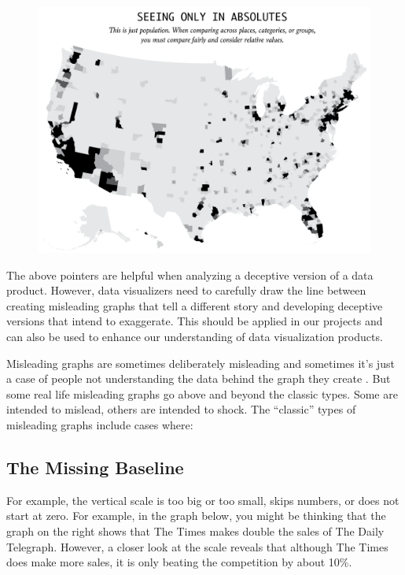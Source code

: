 \documentclass[]{book}
\theoremstyle{definition}
\theoremstyle{definition}
\theoremstyle{definition}
\theoremstyle{remark}
\begin{document}
\begin{figure}
\centering
\includegraphics{images/Maps1.png}
\caption{}
\end{figure}

The above pointers are helpful when analyzing a deceptive version of a
data product. However, data visualizers need to carefully draw the line
between creating misleading graphs that tell a different story and
developing deceptive versions that intend to exaggerate. This should be
applied in our projects and can also be used to enhance our
understanding of data visualization products.

Misleading graphs are sometimes deliberately misleading and sometimes
it's just a case of people not understanding the data behind the graph
they create \citep{andale_2014}. But some real life misleading graphs go
above and beyond the classic types. Some are intended to mislead, others
are intended to shock. The ``classic'' types of misleading graphs
include cases where:

\subsection{The Missing Baseline}\label{the-missing-baseline}

For example, the vertical scale is too big or too small, skips numbers,
or does not start at zero. For example, in the graph below, you might be
thinking that the graph on the right shows that The Times makes double
the sales of The Daily Telegraph. However, a closer look at the scale
reveals that although The Times does make more sales, it is only beating
the competition by about 10\%.
\end{document}
